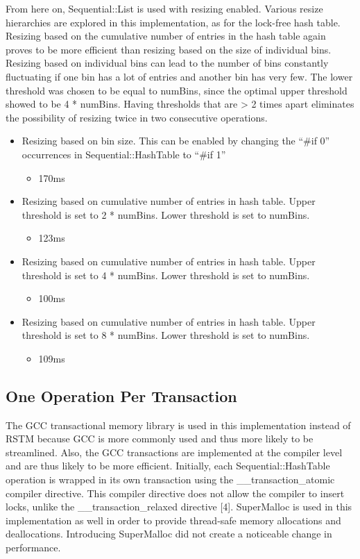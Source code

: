 \documentclass[11pt]{article} %
\begin{document}
From here on, Sequential::List is used with resizing enabled. Various resize hierarchies are explored in this implementation, as for the lock-free hash table. Resizing based on the cumulative number of entries in the hash table again proves to be more efficient than resizing based on the size of individual bins. Resizing based on individual bins can lead to the number of bins constantly fluctuating if one bin has a lot of entries and another bin has very few. The lower threshold was chosen to be equal to numBins, since the optimal upper threshold showed to be 4 * numBins. Having thresholds that are > 2 times apart eliminates the possibility of resizing twice in two consecutive operations.

\begin{itemize}
	\item Resizing based on bin size. This can be enabled by changing the “\#if 0” occurrences in Sequential::HashTable to “\#if 1”
	\begin{itemize}
    		\item 170ms
	\end{itemize}
	\item Resizing based on cumulative number of entries in hash table. Upper threshold is set to 2 * numBins. Lower threshold is set to numBins.
	\begin{itemize}
		\item 123ms
	\end{itemize}
	\item Resizing based on cumulative number of entries in hash table. Upper threshold is set to 4 * numBins. Lower threshold is set to numBins.
	\begin{itemize}
		\item 100ms
	\end{itemize}
	\item Resizing based on cumulative number of entries in hash table. Upper threshold is set to 8 * numBins. Lower threshold is set to numBins.
	\begin{itemize}
		\item 109ms
	\end{itemize}
\end{itemize}

\subsection{One Operation Per Transaction}

The GCC transactional memory library is used in this implementation instead of RSTM because GCC is more commonly used and thus more likely to be streamlined. Also, the GCC transactions are implemented at the compiler level and are thus likely to be more efficient. Initially, each Sequential::HashTable operation is wrapped in its own transaction using the \_\_transaction\_atomic compiler directive. This compiler directive does not allow the compiler to insert locks, unlike the \_\_transaction\_relaxed directive [4]. SuperMalloc is used in this implementation as well in order to provide thread-safe memory allocations and deallocations. Introducing SuperMalloc did not create a noticeable change in performance.
\end{document}
